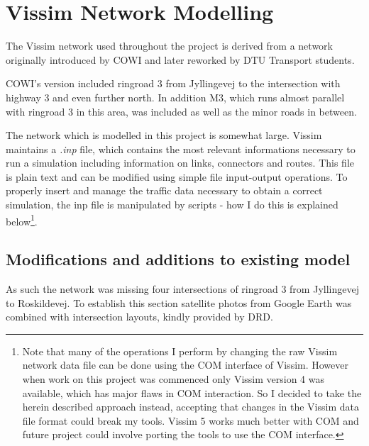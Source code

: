 \section{Vissim Network Modelling}
\label{modelling}
The Vissim network used throughout the project is derived from a network originally introduced by COWI and later reworked by DTU Transport students.

COWI's version included ringroad 3 from Jyllingevej to the intersection with highway 3 and even further north. In addition M3, which runs almost parallel with ringroad 3 in this area, was included as well as the minor roads in between.

The network which is modelled in this project is somewhat large. Vissim maintains a \textit{.inp} file, which contains the most relevant informations necessary to run a simulation including information on links, connectors and routes. This file is plain text and can be modified using simple file input-output operations. To properly insert and manage the traffic data necessary to obtain a correct simulation, the inp file is manipulated by scripts - how I do this is explained below\footnote{Note that many of the operations I perform by changing the raw Vissim network data file can be done using the COM interface of Vissim. However when work on this project was commenced only Vissim version 4 was available, which has major flaws in COM interaction. So I decided to take the herein described approach instead, accepting that changes in the Vissim data file format could break my tools. Vissim 5 works much better with COM and future project could involve porting the tools to use the COM interface.}.

\subsection{Modifications and additions to existing model}

As such the network was missing four intersections of ringroad 3 from Jyllingevej to Roskildevej. To establish this section satellite photos from Google Earth was combined with intersection layouts, kindly provided by DRD.

